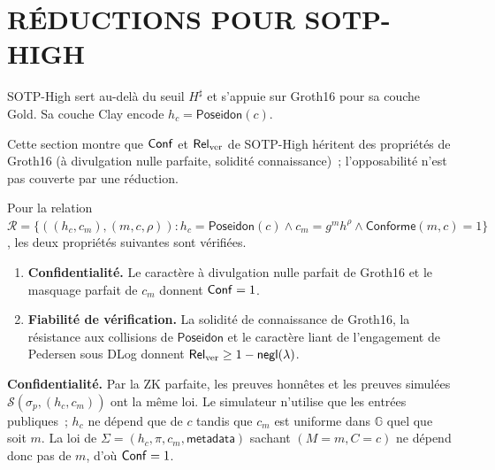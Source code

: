 \section{R\'EDUCTIONS POUR SOTP-HIGH}
\label{sec:gamebased_SOTP-High}
\begin{sloppypar}
SOTP-High sert au-del\`a du seuil $H^\sharp$ et s'appuie sur Groth16
pour sa couche Gold. Sa couche Clay encode $h_c = \mathsf{Poseidon}(c)$.

Cette section montre que $\mathsf{Conf}$ et $\mathsf{Rel}_{\mathrm{ver}}$ de SOTP-High h\'eritent des propri\'et\'es de
Groth16 (\`a divulgation nulle parfaite, solidit\'e connaissance)~; l'opposabilit\'e
n'est pas couverte par une r\'eduction.

\begin{theorem}\label{thm:ann_sotp_high}
Pour la relation $\mathcal{R} = \{((h_c, c_m), (m, c, \rho)) : h_c = \mathsf{Poseidon}(c)
\wedge c_m = g^m h^\rho \wedge \mathsf{Conforme}(m,c) = 1\}$, les deux propri\'et\'es suivantes sont v\'erifi\'ees.
\begin{enumerate}
\item \textbf{Confidentialité.} Le caract\`ere \`a divulgation nulle parfait
      de Groth16 et le masquage parfait de $c_m$ donnent $\mathsf{Conf} = 1$.
\item \textbf{Fiabilité de v\'erification.} La solidité de connaissance de
      Groth16, la r\'esistance aux collisions de $\mathsf{Poseidon}$ et le caract\`ere liant de
      l'engagement de Pedersen sous DLog donnent
      $\mathsf{Rel}_{\mathrm{ver}} \geq 1 - \mathsf{negl}(\lambda)$.
\end{enumerate}
\end{theorem}

\begin{Preuve}

\textbf{Confidentialit\'e.} Par la ZK parfaite, les preuves honn\^etes et les
preuves simul\'ees $\mathcal{S}(\sigma_p, (h_c, c_m))$ ont la m\^eme loi. Le
simulateur n'utilise que les entr\'ees publiques~; $h_c$ ne d\'epend que de $c$ tandis que
$c_m$ est uniforme dans $\mathbb{G}$ quel que soit $m$. La loi de
$\Sigma = (h_c, \pi, c_m, \mathsf{metadata})$ sachant $(M = m, C = c)$ ne d\'epend donc
pas de $m$, d'o\`u $\mathsf{Conf} = 1$.


\end{Preuve}
\end{sloppypar}
